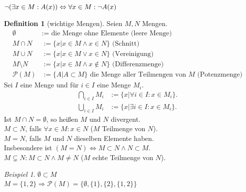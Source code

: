 \documentclass[12pt,a4paper,titlepage]{article} %
\theoremstyle{definition}
\newtheorem{defi}{Definition}[subsection]
\theoremstyle{remark}
\newtheorem*{bsp}{Beispiel}
\begin{document}
$\neg (\exists x \in M : A(x)) \\ \Leftrightarrow \forall x \in M : \neg A(x)$
\begin{defi}[wichtige Mengen]
	Seien $M,N$ Mengen.
	\begin{align*}
		\emptyset &:= \text{ die Menge ohne Elemente (leere Menge)}\\
		M \cap N &:= \{x | x \in M \wedge x \in N \} \text{ (Schnitt)}\\
		M \cup N &:= \{x | x \in M \vee x \in N \} \text{ (Vereinigung)}\\
		M \setminus N &:= \{x | x \in M \wedge x \notin N \} \text{ (Differenzmenge)}\\
		\mathcal{P}(M) &:= \{A | A \subset M \} \text{ die Menge aller Teilmengen von } M \text{ (Potenzmenge)}
	\end{align*}
	Sei $I$ eine Menge und für $i\in I$ eine Menge $M_i$.
	\begin{align*}
		\bigcap\limits_{i\in I} M_i &:= \{x | \forall i \in I:x\in M_i\}.\\	
		\bigcup\limits_{i\in I} M_i &:= \{x | \exists i \in I:x\in M_i\}.
	\end{align*}
	Ist $M\cap N = \emptyset$, so heißen $M$ und $N$ divergent.\\
	$M\subset N$, falls $\forall x \in M: x \in N$ ($M$ Teilmenge von $N$).\\
	$M = N$, falls $M$ und $N$ dieselben Elemente haben.\\
	Insbesondere ist $(M=N) \Leftrightarrow M\subset N \wedge N\subset M$.\\
	$M \subsetneq N : M \subset N \wedge M \neq N$ ($M$ echte Teilmenge von $N$).
\end{defi}
\begin{bsp}
$\emptyset \subset M$\\
$M = \{1,2\} \Rightarrow \mathcal{P}(M) = \{\emptyset, \{1\}, \{2\}, \{1,2\}\}$
\end{bsp}
\end{document}
